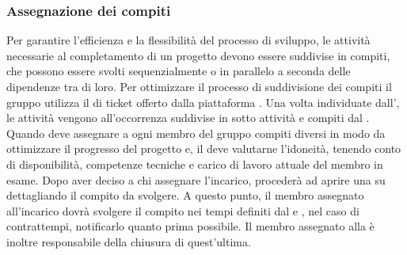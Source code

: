 \subsubsection{Assegnazione dei compiti}
Per garantire l'efficienza e la flessibilità del processo di sviluppo, le attività necessarie al completamento di un progetto devono essere suddivise in compiti, che possono essere svolti sequenzialmente o in parallelo a seconda delle dipendenze tra di loro. Per ottimizzare il processo di suddivisione dei compiti il gruppo utilizza il  di ticket offerto dalla piattaforma .
Una volta individuate dall'\ana{}, le attività vengono all'occorrenza suddivise in sotto attività e compiti dal \RdP{}. Quando deve assegnare a ogni membro del gruppo compiti diversi in modo da ottimizzare il progresso del progetto e, il \RdP{} deve valutarne l'idoneità, tenendo conto di disponibilità, competenze tecniche e carico di lavoro attuale del membro in esame.  Dopo aver deciso a chi assegnare l'incarico,  procederà ad aprire una  su  dettagliando il compito da svolgere. A questo punto, il membro assegnato all'incarico dovrà svolgere il compito nei tempi definiti dal \RdP{} e , nel caso di contrattempi, notificarlo quanto prima possibile. Il membro assegnato alla  è inoltre responsabile della chiusura di quest'ultima.


